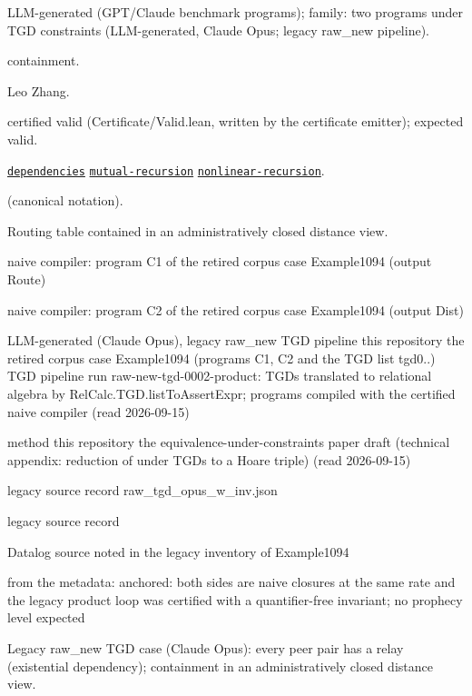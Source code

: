 \documentclass[10pt]{article}
\begin{document}
\begin{description}[leftmargin=2.6cm,style=nextline,itemsep=1pt]

\item[Category] LLM-generated (GPT/Claude benchmark programs); family: two programs under TGD constraints (LLM-generated, Claude Opus; legacy raw\_new pipeline).

\item[Kind] containment.

\item[Contributors] Leo Zhang.

\item[Status] certified valid (Certificate/Valid.lean, written by the certificate emitter); expected valid.

\item[Tags] \hyperref[tag:dependencies]{\texttt{dependencies}} \hyperref[tag:mutual-recursion]{\texttt{mutual-recursion}} \hyperref[tag:nonlinear-recursion]{\texttt{nonlinear-recursion}}.

\item[Input]  (canonical notation).

\item[Summary] Routing table contained in an administratively closed distance view.

\item[Sides] naive compiler: program C1 of the retired corpus case Example1094 (output Route) \par naive compiler: program C2 of the retired corpus case Example1094 (output Dist)

\item[Sources] {\raggedright LLM-generated (Claude Opus), legacy raw\_new TGD pipeline this repository the retired corpus case Example1094 (programs C1, C2 and the TGD list tgd0..) TGD pipeline run raw-new-tgd-0002-product: TGDs translated to relational algebra by RelCalc.TGD.listToAssertExpr; programs compiled with the certified naive compiler (read 2026-09-15) \par method this repository the equivalence-under-constraints paper draft (technical appendix: reduction of  under TGDs to a Hoare triple) (read 2026-09-15) \par legacy source record raw\_tgd\_opus\_w\_inv.json \par legacy source record  \par Datalog source noted in the legacy inventory of Example1094\par}

\item[Obstruction note] from the metadata: anchored: both sides are naive closures at the same rate and the legacy product loop was certified with a quantifier-free invariant; no prophecy level expected

\item[Note] Legacy raw\_new TGD case (Claude Opus): every peer pair has a relay (existential dependency); containment in an administratively closed distance view.

\end{description}
\end{document}
